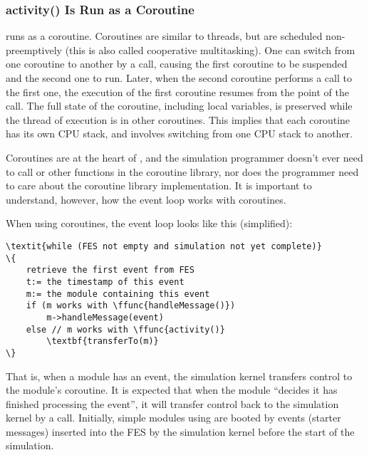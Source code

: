 \subsubsection{activity() Is Run as a Coroutine}
\label{sec:simple-modules:activity:coroutine}

 runs as a coroutine.
Coroutines are similar to threads, but are scheduled
non-preemptively (this is also called cooperative
multitasking).
One can switch from one coroutine to another by a
 call, causing the first coroutine
to be suspended and the second one to run. Later, when the
second coroutine performs a  call
to the first one, the execution of the first coroutine resumes
from the point of the  call.
The full state of the coroutine, including local variables, is preserved
while the thread of execution is in other coroutines.  This implies that each
coroutine has its own CPU stack, and
 involves switching from one CPU stack to
another.

Coroutines are at the heart of {\opp}, and the
simulation programmer doesn't ever need to call 
or other functions in the coroutine library, nor does the programmer need to care
about the coroutine library implementation. It is important to
understand, however, how the event loop works with coroutines.

When using coroutines, the event loop looks like
this (simplified):


\begin{Verbatim}[commandchars=\\\{\}]
\textit{while (FES not empty and simulation not yet complete)}
\{
    retrieve the first event from FES
    t:= the timestamp of this event
    m:= the module containing this event
    if (m works with \ffunc{handleMessage()})
        m->handleMessage(event)
    else // m works with \ffunc{activity()}
        \textbf{transferTo(m)}
\}
\end{Verbatim}



That is, when a module has an event, the simulation
kernel transfers control to the module's coroutine. It is expected
that when the module ``decides it has finished processing the
event'', it will transfer control back to the simulation kernel by
a  call. Initially,
simple modules using  are
booted by events (starter messages)
inserted into the FES by the simulation kernel before the
start of the simulation.



